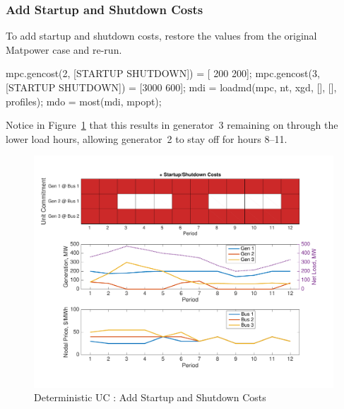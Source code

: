 \documentclass[12pt]{article}
\newcommand{\matpower}[0]{{\sc Matpower}}
\numberwithin{equation}{section}
\numberwithin{table}{section}
\numberwithin{figure}{section}
\begin{document}
\subsubsection*{Add Startup and Shutdown Costs}
To add startup and shutdown costs, restore the values from the original \matpower{} case and re-run.
\begin{Code}
mpc.gencost(2, [STARTUP SHUTDOWN]) = [ 200 200];
mpc.gencost(3, [STARTUP SHUTDOWN]) = [3000 600];
mdi = loadmd(mpc, nt, xgd, [], [], profiles);
mdo = most(mdi, mpopt);
\end{Code}
Notice in Figure~\ref{fig:uc_ex_3} that this results in generator~3 remaining on through the lower load hours, allowing generator~2 to stay off for hours 8--11.
\begin{figure}[hbtp]
  \centering
  \includegraphics[width=\textwidth]{./figures/uc-ex-3}
  \caption{Deterministic UC : Add Startup and Shutdown Costs}
  \label{fig:uc_ex_3}
\end{figure}
\end{document}
